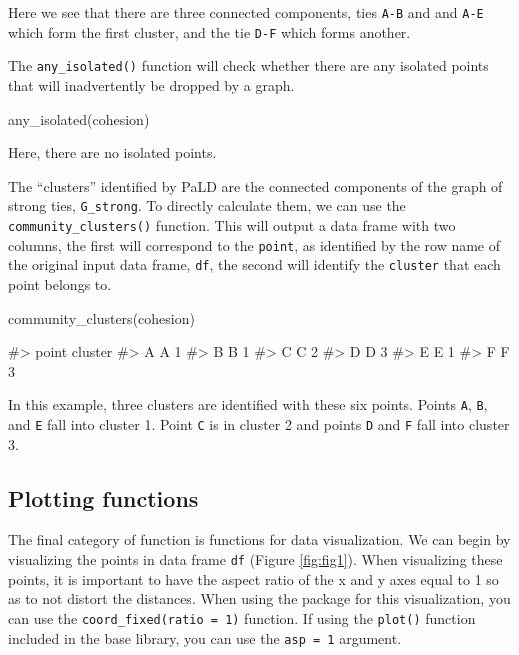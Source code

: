 Here we see that there are three connected components, ties \texttt{A-B}
and and \texttt{A-E} which form the first cluster, and the tie
\texttt{D-F} which forms another.

The \texttt{any\_isolated()} function will check whether there are any
isolated points that will inadvertently be dropped by a graph.

\begin{Schunk}
\begin{Sinput}
any_isolated(cohesion)
\end{Sinput}
\end{Schunk}

Here, there are no isolated points.

The ``clusters'' identified by PaLD are the connected components of the
graph of strong ties, \texttt{G\_strong}. To directly calculate them, we
can use the \texttt{community\_clusters()} function. This will output a
data frame with two columns, the first will correspond to the
\texttt{point}, as identified by the row name of the original input data
frame, \texttt{df}, the second will identify the \texttt{cluster} that
each point belongs to.

\begin{Schunk}
\begin{Sinput}
community_clusters(cohesion)
\end{Sinput}
\begin{Soutput}
#>   point cluster
#> A     A       1
#> B     B       1
#> C     C       2
#> D     D       3
#> E     E       1
#> F     F       3
\end{Soutput}
\end{Schunk}

In this example, three clusters are identified with these six points.
Points \texttt{A}, \texttt{B}, and \texttt{E} fall into cluster 1. Point
\texttt{C} is in cluster 2 and points \texttt{D} and \texttt{F} fall
into cluster 3.

\hypertarget{plotting-functions}{%
\subsection{Plotting functions}\label{plotting-functions}}

The final category of function is functions for data visualization. We
can begin by visualizing the points in data frame \texttt{df} (Figure
\ref{fig:fig1}). When visualizing these points, it is important to have
the aspect ratio of the x and y axes equal to 1 so as to not distort the
distances. When using the  package for this
visualization, you can use the \texttt{coord\_fixed(ratio\ =\ 1)}
function. If using the \texttt{plot()} function included in the base
library, you can use the \texttt{asp\ =\ 1} argument.

